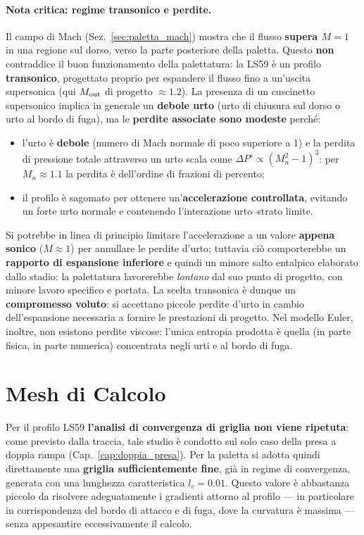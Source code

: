 \paragraph{Nota critica: regime transonico e perdite.}
Il campo di Mach (Sez.~\ref{sec:paletta_mach}) mostra che il flusso \textbf{supera $M=1$} in
una regione sul dorso, verso la parte posteriore della paletta. Questo \textbf{non} contraddice
il buon funzionamento della palettatura: la LS59 è un profilo \textbf{transonico}, progettato
proprio per espandere il flusso fino a un'uscita supersonica (qui $M_{\rm out}$ di progetto
$\approx 1.2$). La presenza di un cuscinetto supersonico implica in generale un \textbf{debole
urto} (urto di chiusura sul dorso o urto al bordo di fuga), ma le \textbf{perdite associate
sono modeste} perché:
\begin{itemize}
  \item l'urto è \textbf{debole} (numero di Mach normale di poco superiore a 1) e la perdita di
    pressione totale attraverso un urto scala come $\Delta P^\circ \propto (M_n^2 - 1)^3$:
    per $M_n \approx 1.1$ la perdita è dell'ordine di frazioni di percento;
  \item il profilo è sagomato per ottenere un'\textbf{accelerazione controllata}, evitando un
    forte urto normale e contenendo l'interazione urto--strato limite.
\end{itemize}
Si potrebbe in linea di principio limitare l'accelerazione a un valore \textbf{appena sonico}
($M \approx 1$) per annullare le perdite d'urto; tuttavia ciò comporterebbe un
\textbf{rapporto di espansione inferiore} e quindi un minore salto entalpico elaborato dallo
stadio: la palettatura lavorerebbe \emph{lontano} dal suo punto di progetto, con minore lavoro
specifico e portata. La scelta transonica è dunque un \textbf{compromesso voluto}: si accettano
piccole perdite d'urto in cambio dell'espansione necessaria a fornire le prestazioni di
progetto. Nel modello Euler, inoltre, non esistono perdite viscose: l'unica entropia prodotta
è quella (in parte fisica, in parte numerica) concentrata negli urti e al bordo di fuga.

\section{Mesh di Calcolo}
\label{sec:paletta_mesh}

Per il profilo LS59 \textbf{l'analisi di convergenza di griglia non viene ripetuta}: come
previsto dalla traccia, tale studio è condotto sul solo caso della presa a doppia rampa
(Cap.~\ref{cap:doppia_presa}). Per la paletta si adotta quindi direttamente una
\textbf{griglia sufficientemente fine}, già in regime di convergenza, generata con una
lunghezza caratteristica $l_c = 0.01$. Questo valore è abbastanza piccolo da risolvere
adeguatamente i gradienti attorno al profilo --- in particolare in corrispondenza del bordo di
attacco e di fuga, dove la curvatura è massima --- senza appesantire eccessivamente il calcolo.

